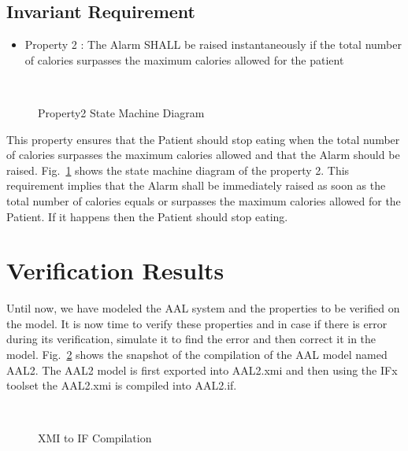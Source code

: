 \documentclass[a4paper,twoside]{article}
\begin{document}
\subsection{Invariant Requirement}

\begin{itemize}
\item Property 2 : The Alarm SHALL be raised instantaneously if the total number of calories surpasses the maximum calories allowed for the patient 
\end{itemize}

\begin{figure}[!h]
  \vspace{8cm}~
  \centering
  {}
  \caption{Property2 State Machine Diagram}
  \label{fig:property3stm}
 \end{figure}
 
  
This property ensures that the Patient should stop eating when the total number of calories surpasses the maximum calories allowed and that the Alarm should be raised. Fig.~\ref{fig:property3stm} shows the state machine diagram of the property 2. This requirement implies that the Alarm shall be immediately raised as soon as the total number of calories equals or surpasses the maximum calories allowed for the Patient. If it happens then the Patient should stop eating.  

\section{Verification Results}
\label{sec:results}
Until now, we have modeled the AAL system and the properties to be verified on the model. It is now time to verify these properties and in case if there is error during its verification, simulate it to find the error and then correct it in the model. Fig.~\ref{fig:xmi2if} shows the snapshot of the compilation of the AAL model named AAL2. The AAL2 model is first exported into AAL2.xmi and then using the IFx toolset the AAL2.xmi is compiled into AAL2.if.

\begin{figure}[!h]
  \vspace{8cm}~
  \centering
  {}
  \caption{XMI to IF Compilation}
  \label{fig:xmi2if}
 \end{figure}
  
\end{document}
